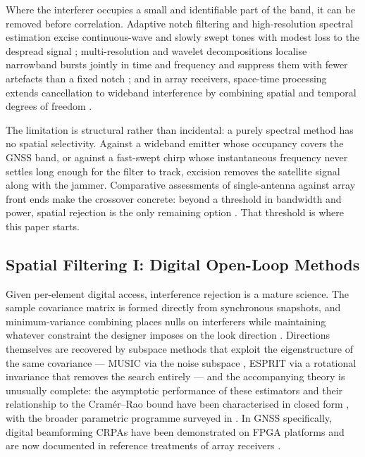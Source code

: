 \documentclass[journal]{IEEEtran}
\begin{document}
Where the interferer occupies a small and identifiable part of the band, it can
be removed before correlation. Adaptive notch filtering and high-resolution
spectral estimation excise continuous-wave and slowly swept tones with modest
loss to the despread signal \cite{elghamrawy2022}; multi-resolution and wavelet
decompositions localise narrowband bursts jointly in time and frequency and
suppress them with fewer artefacts than a fixed notch \cite{Elghamrawy2023};
and in array receivers, space-time processing extends cancellation to wideband
interference by combining spatial and temporal degrees of freedom
\cite{Fante2000}.

The limitation is structural rather than incidental: a purely spectral method
has no spatial selectivity. Against a wideband emitter whose occupancy covers
the GNSS band, or against a fast-swept chirp whose instantaneous frequency
never settles long enough for the filter to track, excision removes the
satellite signal along with the jammer. Comparative assessments of
single-antenna against array front ends make the crossover concrete: beyond a
threshold in bandwidth and power, spatial rejection is the only remaining
option \cite{Elghamrawy2024}. That threshold is where this paper starts.

\subsection{Spatial Filtering I: Digital Open-Loop Methods}
\label{sec:lit:digital}

Given per-element digital access, interference rejection is a mature science.
The sample covariance matrix is formed directly from synchronous snapshots, and
minimum-variance combining places nulls on interferers while maintaining
whatever constraint the designer imposes on the look direction
\cite{capon1969, vanTrees2002}. Directions themselves are recovered by
subspace methods that exploit the eigenstructure of the same covariance ---
MUSIC via the noise subspace \cite{schmidt1986}, ESPRIT via a rotational
invariance that removes the search entirely \cite{roy1989} --- and the
accompanying theory is unusually complete: the asymptotic performance of these
estimators and their relationship to the Cram\'er--Rao bound have been
characterised in closed form \cite{stoica1989}, with the broader parametric
programme surveyed in \cite{krim1996}. In GNSS specifically, digital
beamforming CRPAs have been demonstrated on FPGA platforms and are now
documented in reference treatments of array receivers
\cite{Dores2025, PerezMarcos2023, Obrien2021}.
\end{document}
